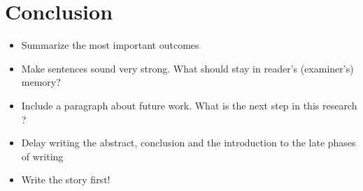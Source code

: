 \chapter{Conclusion}
\begin{itemize}
\item Summarize the most important outcomes
\item Make sentences sound very strong. What should stay in reader's (examiner's) memory?
\item Include a paragraph about future work. What is the next step in this research ?
\item Delay writing the abstract, conclusion and the introduction to the late phases of writing
\item Write the story first!
\end{itemize}